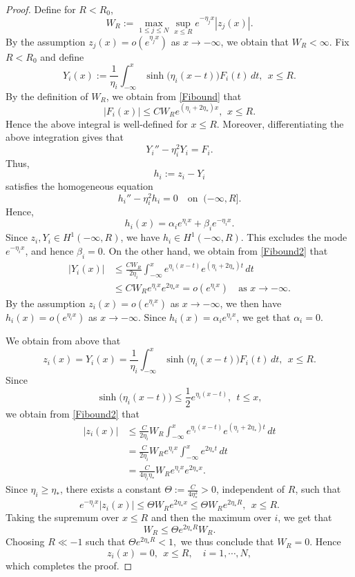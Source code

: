 \documentclass[11pt]{article}
\numberwithin{equation}{section}
\theoremstyle{definition}
\begin{document}
\begin{proof}
Define for \(R<R_0\),
\[
W_R:=
\max_{1\le j\le N}\sup_{x\le R}
e^{-\eta_jx}|z_j(x)|.
\]
By the assumption \(z_j(x)=o(e^{\eta_jx})\) as \(x\to-\infty\),
we obtain that \(W_R<\infty\).
Fix \(R<R_0\) and define
\[
Y_i(x)
:=
\frac1{\eta_i}
\int_{-\infty}^{x}
\sinh\bigl(\eta_i(x-t)\bigr)F_i(t)\,dt ,
\ \  x\le R.
\]
By the definition of \(W_R\), we obtain from \eqref{Fibound} that
\begin{equation}\label{Fibound2}
|F_i(x)|
\le
CW_R e^{(\eta_i+2\eta_*)x},\,\ x\le R.
\end{equation}
Hence the above integral
is well-defined for \(x\le R\). Moreover, differentiating the above
integration gives that
\[
Y_i''-\eta_i^2Y_i=F_i .
\]
Thus,
\[
h_i:=z_i-Y_i
\]
satisfies the homogeneous equation
\[
h_i''-\eta_i^2h_i=0
\quad\text{on }\ (-\infty,R].
\]
Hence,
\[
h_i(x)=\alpha_i e^{\eta_i x}+\beta_i e^{-\eta_i x}.
\]
Since \(z_i,Y_i\in H^1(-\infty,R)\), we have
\(h_i\in H^1(-\infty,R)\). This excludes the mode \(e^{-\eta_i x}\), and hence \(\beta_i=0\).
On the other hand, we obtain from  \eqref{Fibound2} that
\[
\begin{aligned}
|Y_i(x)|
&\le
\frac{CW_R}{2\eta_i}
\int_{-\infty}^{x}
e^{\eta_i(x-t)}e^{(\eta_i+2\eta_*)t}\,dt  \\
&\le
C W_R e^{\eta_i x}e^{2\eta_*x}
=o(e^{\eta_i x})\quad \text{as }x\to-\infty.
\end{aligned}
\]
By the assumption
\(
z_i(x)=o(e^{\eta_i x})\)
as \(x\to-\infty\),
we then have
\(
h_i(x)=o(e^{\eta_i x})
\) as $x\to-\infty$.
Since \(h_i(x)=\alpha_i e^{\eta_i x}\), we get that \(\alpha_i=0\).



We obtain from above that
\[
z_i(x)=Y_i(x)
=
\frac1{\eta_i}
\int_{-\infty}^{x}
\sinh\bigl(\eta_i(x-t)\bigr)F_i(t)\,dt ,
\ \  x\le R.
\]
Since
\[
\sinh\bigl(\eta_i(x-t)\bigr)
\le
\frac12 e^{\eta_i(x-t)},
\ \  t\le x,
\]
we obtain from \eqref{Fibound2} that
\[
\begin{aligned}
	|z_i(x)|
	&\le
	\frac{C}{2\eta_i}W_R
	\int_{-\infty}^{x}
	e^{\eta_i(x-t)}e^{(\eta_i+2\eta_*)t}\,dt  \\
	&=
	\frac{C}{2\eta_i}W_R e^{\eta_i x}
	\int_{-\infty}^{x}e^{2\eta_*t}\,dt  \\
	&=
	\frac{C}{4\eta_i\eta_*}
	W_R e^{\eta_i x}e^{2\eta_*x}.
\end{aligned}
\]
Since \(\eta_i\ge\eta_*\), there exists a constant \(\Theta:=\frac{C}{4\eta_*^2}>0\),
independent of \(R\), such that
\[
e^{-\eta_i x}|z_i(x)|
\le
\Theta W_R e^{2\eta_*x}
\le
\Theta W_R e^{2\eta_*R},
\ \  x\le R.
\]
Taking the supremum over \(x\le R\) and then the maximum over \(i\),
we get that
\[
W_R\le \Theta e^{2\eta_*R}W_R.
\]
Choosing \(R\ll-1\) such that
\(
\Theta e^{2\eta_*R}<1,
\)
we thus conclude that \(W_R=0\). Hence
\[
z_i(x)=0,
\ \  x\le R,\quad i=1,\cdots,N,
\]
which completes the proof.
\end{proof}
\end{document}
